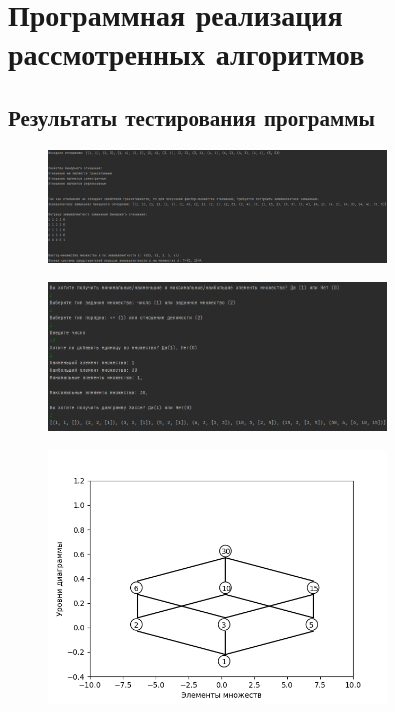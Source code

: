 \documentclass[bachelor, och, labwork]{shiza}
\begin{document}
\section{Программная реализация рассмотренных алгоритмов}
    
    \subsection{Результаты тестирования программы}

        \begin{figure}[H]
            \centering
            \includegraphics[width=0.8\textwidth]{pic/1.png}
            \caption{}
        \end{figure}

        
        \begin{figure}[H]
            \centering
            \includegraphics[width=0.8\textwidth]{pic/2.png}
            \caption{}
        \end{figure}

        
        \begin{figure}[H]
            \centering
            \includegraphics[width=0.8\textwidth]{pic/3.png}
            \caption{}
        \end{figure}
\end{document}
